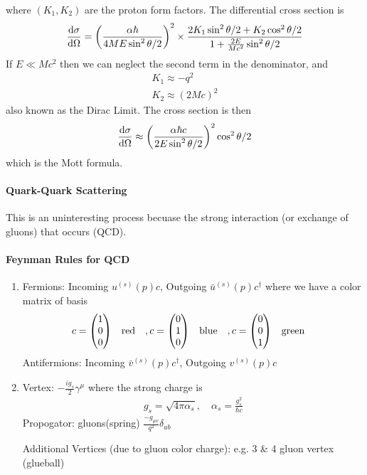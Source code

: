 \documentclass[../main.tex]{subfiles}
\begin{document}
where $(K_1, K_2)$ are the proton form factors. The differential cross section is
\begin{align*}
    \dv{\sigma}{\Omega} = \qt(\frac{\alpha \hbar}{4 M E \sin^2{\theta/2}})^2 \times
    \frac{2K_1 \sin^2\theta/2 + K_2 \cos^2\theta/2}{1 + \frac{2E}{Mc^2}\sin^2\theta/2}
\end{align*}
If $E \ll Mc^2$ then we can neglect the second term in the denominator, and 
\begin{align*}
    K_1 \approx - q^2 \\
    K_2 \approx (2Mc)^2
\end{align*}
also known as the Dirac Limit. The cross section is then
\begin{align*}
    \dv{\sigma}{\Omega} \approx \qt(\frac{\alpha \hbar c}{2E \sin^2\theta/2})^2 \cos^2\theta/2
\end{align*}
which is the Mott formula.

\paragraph*{Quark-Quark Scattering} This is an uninteresting process becuase the strong interaction 
(or exchange of gluons) that occurs (QCD). 
\paragraph*{Feynman Rules for QCD}
\begin{enumerate}
    \item Fermions: Incoming $u^{(s)}(p)c$, Outgoing $\bar u^{(s)}(p)c^\dagger$ where we have a
    color matrix of basis
    \begin{align*}
        c = \mqty(1 \\ 0 \\ 0) \qqtext{red}, c = \mqty(0 \\ 1 \\ 0) \qqtext{blue},
        c = \mqty(0 \\ 0 \\ 1) \qqtext{green}
    \end{align*}
    Antifermions: Incoming $\bar v^{(s)}(p)c^\dagger$, Outgoing $v^{(s)}(p)c$
    \item Vertex: $-\frac{ig_s}{2} \gamma^\mu$ where the strong charge is 
    \begin{align*}
        g_s = \sqrt{4\pi \alpha_s}, \quad \alpha_s = \frac{g_s^2}{\hbar c}
    \end{align*}
    Propogator: gluons(spring) $\frac{-g_{\mu\nu}}{q^2} \delta_{ab}$

    Additional Vertices (due to gluon color charge): e.g. 3 \& 4 gluon vertex (glueball)
\end{enumerate}
\end{document}
